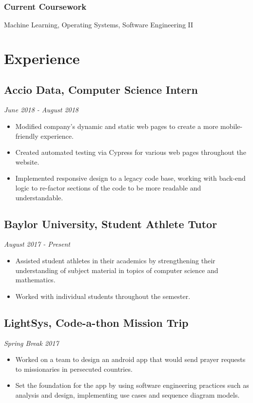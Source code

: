 \documentclass{article}
\begin{document}
\subsubsection{Current Coursework}
Machine Learning, Operating Systems, Software Engineering II

\section{Experience}

\subsection{Accio Data, Computer Science Intern}
\hfill\textit{June 2018 - August 2018}

\begin{itemize}
	\itemsep0em
	\item Modified company's dynamic and static web pages to create a more
	mobile-friendly experience.
	\item Created automated testing via Cypress for various web pages
	throughout the website.
	\item Implemented responsive design to a legacy code base, working with
	back-end logic to re-factor sections of the code to be more
	readable and understandable.  
\end{itemize}

\subsection{Baylor University, Student Athlete Tutor} 
\hfill\textit{August 2017 - Present}

\begin{itemize}
	\itemsep0em
	\item Assisted student athletes in their academics by strengthening their understanding of subject material in topics of computer science and mathematics.
	
	\item Worked with individual students throughout the semester. 
\end{itemize}

\subsection{LightSys, Code-a-thon Mission Trip}
\hfill
\textit{Spring Break 2017}

\begin{itemize}
	\itemsep0em
	\item Worked on a team to design an android app that would send prayer requests
	to missionaries in persecuted countries. 

	\item Set the foundation for the app by using software engineering practices such as analysis and design, implementing use cases and sequence diagram models.
\end{itemize}
  
\end{document}
